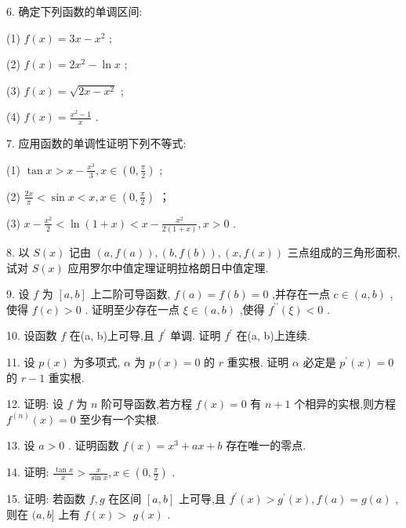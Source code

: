 6. 确定下列函数的单调区间:

(1) \(f\left( x\right)  = {3x} - {x}^{2}\) ;

(2) \(f\left( x\right)  = 2{x}^{2} - \ln x\) ;

(3) \(f\left( x\right)  = \sqrt{{2x} - {x}^{2}}\) ;

(4) \(f\left( x\right)  = \frac{{x}^{2} - 1}{x}\) .

7. 应用函数的单调性证明下列不等式:

(1) \(\tan x > x - \frac{{x}^{3}}{3},x \in  \left( {0,\frac{\pi }{2}}\right)\) ;

(2) \(\frac{2x}{\pi } < \sin x < x,x \in  \left( {0,\frac{\pi }{2}}\right)\) ；

(3) \(x - \frac{{x}^{2}}{2} < \ln \left( {1 + x}\right)  < x - \frac{{x}^{2}}{2\left( {1 + x}\right) },x > 0\) .

8. 以 \(S\left( x\right)\) 记由 \(\left( {a,f\left( a\right) }\right) ,\left( {b,f\left( b\right) }\right) ,\left( {x,f\left( x\right) }\right)\) 三点组成的三角形面积,试对 \(S\left( x\right)\) 应用罗尔中值定理证明拉格朗日中值定理.

9. 设 \(f\) 为 \(\left\lbrack  {a,b}\right\rbrack\) 上二阶可导函数, \(f\left( a\right)  = f\left( b\right)  = 0\) ,并存在一点 \(c \in  \left( {a,b}\right)\) ,使得 \(f\left( c\right)  > 0\) . 证明至少存在一点 \(\xi  \in  \left( {a,b}\right)\) ,使得 \({f}^{\prime \prime }\left( \xi \right)  < 0\) .

10. 设函数 \(f\) 在(a, b)上可导,且 \({f}^{\prime }\) 单调. 证明 \({f}^{\prime }\) 在(a, b)上连续.

11. 设 \(p\left( x\right)\) 为多项式, \(\alpha\) 为 \(p\left( x\right)  = 0\) 的 \(r\) 重实根. 证明 \(\alpha\) 必定是 \({p}^{\prime }\left( x\right)  = 0\) 的 \(r - 1\) 重实根.

12. 证明: 设 \(f\) 为 \(n\) 阶可导函数,若方程 \(f\left( x\right)  = 0\) 有 \(n + 1\) 个相异的实根,则方程 \({f}^{\left( n\right) }\left( x\right)  = 0\) 至少有一个实根.

13. 设 \(a > 0\) . 证明函数 \(f\left( x\right)  = {x}^{3} + {ax} + b\) 存在唯一的零点.

14. 证明: \(\frac{\tan x}{x} > \frac{x}{\sin x},x \in  \left( {0,\frac{\pi }{2}}\right)\) .

15. 证明: 若函数 \(f,g\) 在区间 \(\left\lbrack  {a,b}\right\rbrack\) 上可导,且 \({f}^{\prime }\left( x\right)  > {g}^{\prime }\left( x\right) ,f\left( a\right)  = g\left( a\right)\) ,则在 \((a,b\rbrack\) 上有 \(f\left( x\right)  >\)  \(g\left( x\right)\) .


